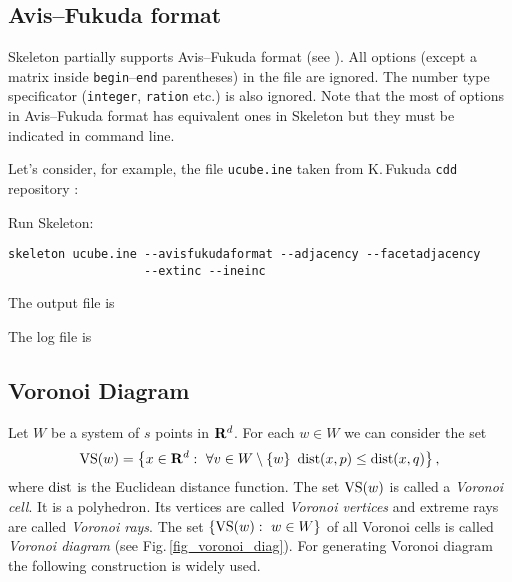 \documentclass{article}
\newcommand{\Skeleton}{{\sc Skeleton}\xspace}
\newcommand{\RR}{{\rm\bf R}}
\newcommand{\VS}{\mathop{\rm VS}\nolimits}
\newcommand{\dist}{\mathop{\rm dist}\nolimits}
\newcommand{\set}[1]{\left\{ #1\right\}}
\begin{document}
\subsection{Avis--Fukuda format}

\Skeleton partially supports Avis--Fukuda format (see \cite{Avis,Fukuda02}).
All options (except a matrix inside \verb$begin$--\verb$end$ parentheses) in the file are ignored.
The number type specificator (\verb$integer$, \verb$ration$ etc.) is also ignored.
Note that the most of options in Avis--Fukuda format has equivalent ones in \Skeleton 
but they must be indicated in command line.

Let's consider, for example, the file \verb$ucube.ine$ taken from K.\,Fukuda \verb$cdd$ repository \cite{Fukuda02}:

Run \Skeleton:
\begin{verbatim}
skeleton ucube.ine --avisfukudaformat --adjacency --facetadjacency 
                   --extinc --ineinc
\end{verbatim}
The output file is

The log file is


\subsection{Voronoi Diagram}

Let $W$ be a system of $s$ points in $\RR^d$. For each $w\in W$ we can
consider the set
$$
\VS(w) = \set{x\in\RR^d:~\forall v\in W \setminus\set{w}~\dist(x,p)\le\dist(x,q)},
$$
where $\dist$ is the Euclidean distance function.
The set $\VS(w)$ is called a {\em Voronoi cell}. It is a polyhedron.
Its vertices are called {\em Voronoi vertices} and extreme rays are called
{\em Voronoi rays}. The set $\set{\VS(w):~w\in W}$ of all Voronoi cells 
is called {\em Voronoi diagram} (see Fig.\,\ref{fig_voronoi_diag}). 
For generating Voronoi diagram the following
construction is widely used.
\end{document}
